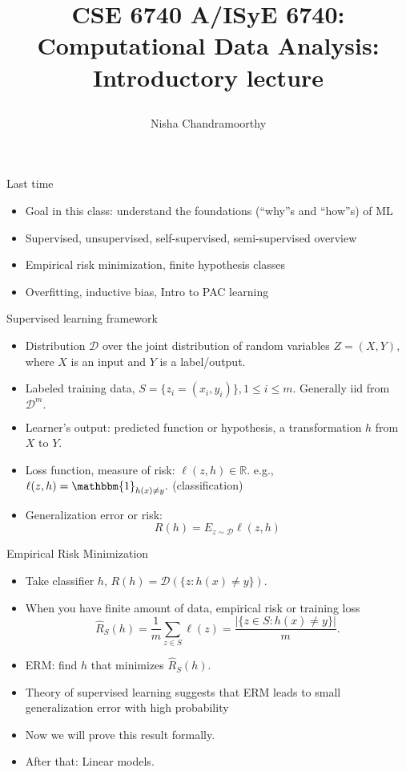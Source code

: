 \documentclass[final]{beamer}
\title{\begin{huge}{CSE 6740 A/ISyE 6740: Computational Data Analysis: Introductory lecture}\end{huge}} %
\author{Nisha Chandramoorthy} %
\begin{document}
\frame{\titlepage}


\begin{frame}{Last time}
\begin{itemize}
	\item  Goal in this class: understand the foundations (``why''s and ``how''s) of ML
	\pause
	\item Supervised, unsupervised, self-supervised, semi-supervised overview
	\pause 
	\item Empirical risk minimization, finite hypothesis classes
	\pause 
	\item Overfitting, inductive bias, Intro to PAC learning
\end{itemize}
\end{frame}
\begin{frame}{Supervised learning framework}
	\begin{itemize}
		\item Distribution $\mathcal{D}$ over the joint distribution of random variables $Z = (X, Y)$, where $X$ is an input and $Y$ is a label/output.
		\pause
	\item Labeled training data, $S = \{z_i = (x_i, y_i)\}, 1\leq i \leq m.$ Generally iid from $\mathcal{D}^m.$
		\pause
		\item Learner's output: predicted function or hypothesis, a transformation $h$ from $X$ to $Y$.
		\pause
	\item Loss function, measure of risk:  $\ell(z, h) \in \mathbb{R}$. e.g., $\ell(z, h) =  \mathbbm{1}_{h(x) \neq y}.$ (classification)
	\pause
	\item Generalization error or risk: 
		$$R(h) = E_{z\sim \mathcal{D}} \ell(z, h)$$
	\end{itemize}
\end{frame}
\begin{frame}{Empirical Risk Minimization}
	\begin{itemize}
		\item Take classifier $h$, $R(h) = \mathcal{D}(\{z: h(x) \neq y\}).$
		\pause
		\item When you have finite amount of data, empirical risk or training loss
		$$ \hat{R}_S(h) = \dfrac{1}{m} \sum_{z \in S} \ell(z) = \dfrac{|\{z \in S: h(x) \neq y\}|}{m}.$$
		\pause
	\item ERM: find $h$ that minimizes $\hat{R}_S(h).$
	\pause
	\item Theory of supervised learning suggests that ERM leads to small generalization error with high probability
	\pause
	\item Now we will prove this result formally. 
	\pause
\item After that: Linear models.
\end{itemize}
\end{frame}
\end{document}
